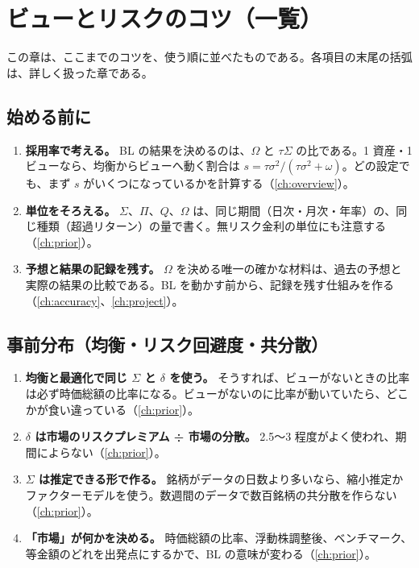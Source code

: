 \chapter{ビューとリスクのコツ（一覧）}\label{ch:tips}

この章は、ここまでのコツを、使う順に並べたものである。各項目の末尾の括弧は、詳しく扱った章である。

\section{始める前に}

\begin{enumerate}[label=\textbf{\arabic*.},leftmargin=2.2em]
\item \textbf{採用率で考える。} BL の結果を決めるのは、$\Omega$ と $\tau\Sigma$ の比である。1 資産・1 ビューなら、均衡からビューへ動く割合は $s=\tau\sigma^2/(\tau\sigma^2+\omega)$。どの設定でも、まず $s$ がいくつになっているかを計算する（\ref{ch:overview}）。
\item \textbf{単位をそろえる。} $\Sigma$、$\Pi$、$Q$、$\Omega$ は、同じ期間（日次・月次・年率）の、同じ種類（超過リターン）の量で書く。無リスク金利の単位にも注意する（\ref{ch:prior}）。
\item \textbf{予想と結果の記録を残す。} $\Omega$ を決める唯一の確かな材料は、過去の予想と実際の結果の比較である。BL を動かす前から、記録を残す仕組みを作る（\ref{ch:accuracy}、\ref{ch:project}）。
\end{enumerate}

\section{事前分布（均衡・リスク回避度・共分散）}

\begin{enumerate}[label=\textbf{\arabic*.},leftmargin=2.2em,resume]
\item \textbf{均衡と最適化で同じ $\Sigma$ と $\delta$ を使う。} そうすれば、ビューがないときの比率は必ず時価総額の比率になる。ビューがないのに比率が動いていたら、どこかが食い違っている（\ref{ch:prior}）。
\item \textbf{$\delta$ は市場のリスクプレミアム ÷ 市場の分散。} 2.5〜3 程度がよく使われ、期間によらない（\ref{ch:prior}）。
\item \textbf{$\Sigma$ は推定できる形で作る。} 銘柄がデータの日数より多いなら、縮小推定かファクターモデルを使う。数週間のデータで数百銘柄の共分散を作らない（\ref{ch:prior}）。
\item \textbf{「市場」が何かを決める。} 時価総額の比率、浮動株調整後、ベンチマーク、等金額のどれを出発点にするかで、BL の意味が変わる（\ref{ch:prior}）。
\end{enumerate}

